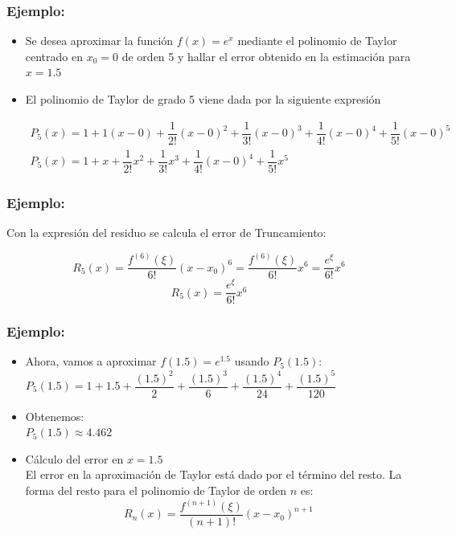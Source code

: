 \documentclass{beamer}
\begin{document}
\begin{frame}
  \frametitle{Ejemplo:}
  \begin{itemize}
    \item Se  desea aproximar la funci\'on $f(x)=e^x$ mediante el polinomio de Taylor centrado en $x_0=0$ de orden 5 y hallar el error obtenido en la estimaci\'on para $x=1.5$ 
   
    \item El polinomio de Taylor de grado 5 viene dada por la siguiente expresi\'on
    \begin{block}{}
    \scriptsize{
    $$
    \begin{array}{c}
      P_5(x) = 1+1(x-0)+\dfrac{1}{2!}(x-0)^2+\dfrac{1}{3!}(x-0)^3+\dfrac{1}{4!}(x-0)^4+\dfrac{1}{5!}(x-0)^5\\[10pt]
      P_5(x) = 1+x+\dfrac{1}{2!}x^2+\dfrac{1}{3!}x^3+\dfrac{1}{4!}(x-0)^4+\dfrac{1}{5!}x^5
    \end{array}
    $$}
    \end{block}
  \end{itemize}
\end{frame}
\begin{frame}
  \frametitle[short title]{Ejemplo:}
  Con la expresi\'on del residuo se calcula el error de Truncamiento:
  \begin{block}{}
    $$
    R_5(x) = \dfrac{f^{(6)}(\xi)}{6!}(x-x_0)^6=\dfrac{f^{(6)}(\xi)}{6!}x^6 = \dfrac{e^\xi}{6!}x^6
    $$
    $$
    R_5(x)=\dfrac{e^\xi}{6!}x^6
    $$
  \end{block}
\end{frame}
\begin{frame}
\frametitle{Ejemplo:}
 \begin{itemize}
   \item Ahora, vamos a aproximar $f(1.5) = e^{1.5}$ usando $P_5(1.5)$:\\
   $P_5(1.5) = 1 + 1.5 + \dfrac{(1.5)^2}{2} + \dfrac{(1.5)^3}{6} + \dfrac{(1.5)^4}{24} + \dfrac{(1.5)^5}{120}$
 \item<2-> Obtenemos:\\
   $P_5(1.5) \approx 4.462$
 \item<3-> C\'alculo del error en $x = 1.5$\\
 El error en la aproximaci\'on de Taylor est\'a dado por el t\'ermino del resto. La forma del resto para el polinomio de Taylor de orden $n$ es:\\
 $$
 R_n(x) = \dfrac{f^{(n+1)}(\xi)}{(n+1)!}(x-x_0)^{n+1}
 $$ 
 \end{itemize}
\end{frame}
\end{document}
